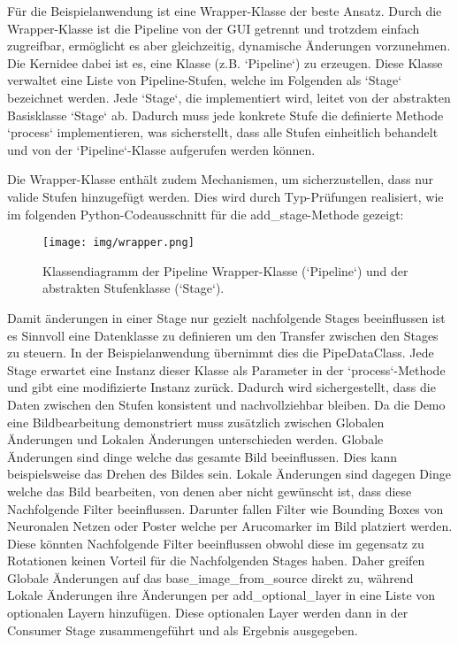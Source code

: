 \documentclass[a4paper]{article} %
\begin{document}
Für die Beispielanwendung ist eine Wrapper-Klasse der beste Ansatz. Durch die Wrapper-Klasse ist die Pipeline von der GUI getrennt und trotzdem einfach zugreifbar, ermöglicht es aber gleichzeitig, dynamische Änderungen vorzunehmen. Die Kernidee dabei ist es, eine Klasse (z.B. `Pipeline`) zu erzeugen. Diese Klasse verwaltet eine Liste von Pipeline-Stufen, welche im Folgenden als `Stage` bezeichnet werden. Jede `Stage`, die implementiert wird, leitet von der abstrakten Basisklasse `Stage` ab. Dadurch muss jede konkrete Stufe die definierte Methode `process` implementieren, was sicherstellt, dass alle Stufen einheitlich behandelt und von der `Pipeline`-Klasse aufgerufen werden können.

Die Wrapper-Klasse enthält zudem Mechanismen, um sicherzustellen, dass nur valide Stufen hinzugefügt werden. Dies wird durch Typ-Prüfungen realisiert, wie im folgenden Python-Codeausschnitt für die add_stage-Methode gezeigt:

\begin{figure}[htbp]
    \centering
    \texttt{[image: img/wrapper.png]}
    \caption{Klassendiagramm der Pipeline Wrapper-Klasse (`Pipeline`) und der abstrakten Stufenklasse (`Stage`).}
    \label{fig:wrapper}
\end{figure}

Damit änderungen in einer Stage nur gezielt nachfolgende Stages beeinflussen ist es Sinnvoll eine Datenklasse zu definieren um den Transfer zwischen den Stages zu steuern. In der Beispielanwendung übernimmt dies die PipeDataClass. Jede Stage erwartet eine Instanz dieser Klasse als Parameter in der `process`-Methode und gibt eine modifizierte Instanz zurück. Dadurch wird sichergestellt, dass die Daten zwischen den Stufen konsistent und nachvollziehbar bleiben.
Da die Demo eine Bildbearbeitung demonstriert muss zusätzlich zwischen Globalen Änderungen und Lokalen Änderungen unterschieden werden. Globale Änderungen sind dinge welche das gesamte Bild beeinflussen. Dies kann beispielsweise das Drehen des Bildes sein. Lokale Änderungen sind dagegen Dinge welche das Bild bearbeiten, von denen aber nicht gewünscht ist, dass diese Nachfolgende Filter beeinflussen. Darunter fallen Filter wie Bounding Boxes von Neuronalen Netzen oder Poster welche per Arucomarker im Bild platziert werden. Diese könnten Nachfolgende Filter beeinflussen obwohl diese im gegensatz zu Rotationen keinen Vorteil für die Nachfolgenden Stages haben. Daher greifen Globale Änderungen auf das base_image_from_source direkt zu, während Lokale Änderungen ihre Änderungen per add_optional_layer in eine Liste von optionalen Layern hinzufügen. Diese optionalen Layer werden dann in der Consumer Stage zusammengeführt und als Ergebnis ausgegeben.
\end{document}
